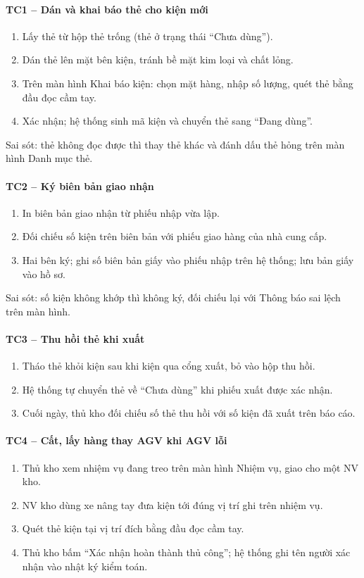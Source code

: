 \paragraph{TC1 -- Dán và khai báo thẻ cho kiện mới}
\begin{enumerate}
  \item Lấy thẻ từ hộp thẻ trống (thẻ ở trạng thái “Chưa dùng”).
  \item Dán thẻ lên mặt bên kiện, tránh bề mặt kim loại và chất lỏng.
  \item Trên màn hình Khai báo kiện: chọn mặt hàng, nhập số lượng, quét thẻ bằng đầu đọc cầm tay.
  \item Xác nhận; hệ thống sinh mã kiện và chuyển thẻ sang “Đang dùng”.
\end{enumerate}
Sai sót: thẻ không đọc được thì thay thẻ khác và đánh dấu thẻ hỏng trên màn hình Danh mục thẻ.

\paragraph{TC2 -- Ký biên bản giao nhận}
\begin{enumerate}
  \item In biên bản giao nhận từ phiếu nhập vừa lập.
  \item Đối chiếu số kiện trên biên bản với phiếu giao hàng của nhà cung cấp.
  \item Hai bên ký; ghi số biên bản giấy vào phiếu nhập trên hệ thống; lưu bản giấy vào hồ sơ.
\end{enumerate}
Sai sót: số kiện không khớp thì không ký, đối chiếu lại với Thông báo sai lệch trên màn hình.

\paragraph{TC3 -- Thu hồi thẻ khi xuất}
\begin{enumerate}
  \item Tháo thẻ khỏi kiện sau khi kiện qua cổng xuất, bỏ vào hộp thu hồi.
  \item Hệ thống tự chuyển thẻ về “Chưa dùng” khi phiếu xuất được xác nhận.
  \item Cuối ngày, thủ kho đối chiếu số thẻ thu hồi với số kiện đã xuất trên báo cáo.
\end{enumerate}

\paragraph{TC4 -- Cất, lấy hàng thay AGV khi AGV lỗi}
\begin{enumerate}
  \item Thủ kho xem nhiệm vụ đang treo trên màn hình Nhiệm vụ, giao cho một NV kho.
  \item NV kho dùng xe nâng tay đưa kiện tới đúng vị trí ghi trên nhiệm vụ.
  \item Quét thẻ kiện tại vị trí đích bằng đầu đọc cầm tay.
  \item Thủ kho bấm “Xác nhận hoàn thành thủ công”; hệ thống ghi tên người xác nhận vào nhật ký kiểm toán.
\end{enumerate}

